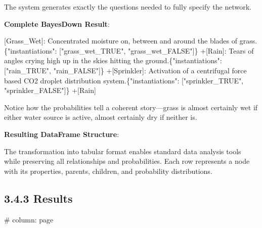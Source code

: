\documentclass[
  11pt,
  letterpaper,
  openany]{book}
\newenvironment{Shaded}{\begin{snugshade}}{\end{snugshade}}
\newcommand{\CommentTok}[1]{\textcolor[rgb]{0.37,0.37,0.37}{#1}}
\newcommand{\NormalTok}[1]{\textcolor[rgb]{0.00,0.23,0.31}{#1}}
\newcommand{\OtherTok}[1]{\textcolor[rgb]{0.00,0.23,0.31}{#1}}
\begin{document}
\begin{landscape}
The system generates exactly the questions needed to fully specify the
network.

\textbf{Complete BayesDown Result}:

\begin{Shaded}
\begin{Highlighting}[]
\OtherTok{[Grass\_Wet]: }\NormalTok{Concentrated moisture on, between and around the blades of grass.\{"instantiations": }\CommentTok{[}\OtherTok{"grass\_wet\_TRUE", "grass\_wet\_FALSE"}\CommentTok{]}\NormalTok{\}    }
\NormalTok{    +}\CommentTok{[}\OtherTok{Rain}\CommentTok{]}\NormalTok{: Tears of angles crying high up in the skies hitting the ground.\{"instantiations": }\CommentTok{[}\OtherTok{"rain\_TRUE", "rain\_FALSE"}\CommentTok{]}\NormalTok{\}}
\NormalTok{    +}\CommentTok{[}\OtherTok{Sprinkler}\CommentTok{]}\NormalTok{: Activation of a centrifugal force based CO2 droplet distribution system.\{"instantiations": }\CommentTok{[}\OtherTok{"sprinkler\_TRUE", "sprinkler\_FALSE"}\CommentTok{]}\NormalTok{\}}
\NormalTok{        +}\CommentTok{[}\OtherTok{Rain}\CommentTok{]}
\end{Highlighting}
\end{Shaded}

Notice how the probabilities tell a coherent story---grass is almost
certainly wet if either water source is active, almost certainly dry if
neither is.

\textbf{Resulting DataFrame Structure}:

The transformation into tabular format enables standard data analysis
tools while preserving all relationships and probabilities. Each row
represents a node with its properties, parents, children, and
probability distributions.

\subsection{3.4.3 Results}\label{sec-rsg-results}

\#\textbar{} column: page


\end{landscape}
\end{document}
